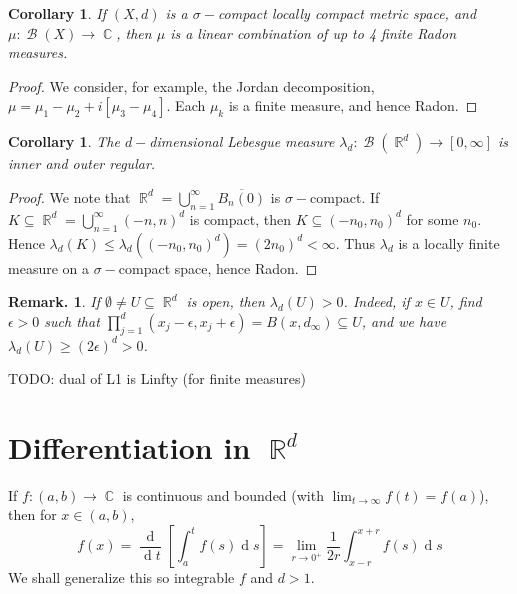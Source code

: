 \documentclass[12pt, a4paper]{memoir}
\DeclareMathOperator{\R}{{\mathbb{R}}}
\DeclareMathOperator{\C}{{\mathbb{C}}}
\newtheorem{corollary}[theorem]{Corollary}
\theoremstyle{nonumberplain}
\newtheorem{remark}{Remark.}
\newtheorem{proof}{Proof}
\DeclareMathOperator{\B}{\mathcal{B}}
\renewcommand{\d}[1]{\ensuremath{\operatorname{d}\!{#1}}} %
\begin{document}
\begin{corollary}
    If $(X,d)$ is a $\sigma-$compact locally compact metric space, and $\mu:\B(X)\to\C$, then $\mu$ is a linear combination of up to 4 finite Radon measures.
\end{corollary}
\begin{proof}
    We consider, for example, the Jordan decomposition, $\mu=\mu_1-\mu_2+i[\mu_3-\mu_4]$.
    Each $\mu_k$ is a finite measure, and hence Radon.
\end{proof}
\begin{corollary}
    The $d-$dimensional Lebesgue measure $\lambda_d:\B(\R^d)\to[0,\infty]$ is inner and outer regular.
\end{corollary}
\begin{proof}
    We note that $\R^d=\bigcup_{n=1}^\infty\overline{B_n(0)}$ is $\sigma-$compact.
    If $K\subseteq\R^d=\bigcup_{n=1}^\infty(-n,n)^d$ is compact, then $K\subseteq(-n_0,n_0)^d$ for some $n_0$.
    Hence $\lambda_d(K)\leq\lambda_d((-n_0,n_0)^d)=(2n_0)^d<\infty$.
    Thus $\lambda_d$ is a locally finite measure on a $\sigma-$compact space, hence Radon.
\end{proof}
\begin{remark}
    If $\emptyset\neq U\subseteq\R^d$ is open, then $\lambda_d(U)>0$.
    Indeed, if $x\in U$, find $\epsilon>0$ such that $\prod_{j=1}^d(x_j-\epsilon,x_j+\epsilon)=B(x,d_\infty)\subseteq U$, and we have $\lambda_d(U)\geq(2\epsilon)^d>0$.
\end{remark}
TODO: dual of L1 is Linfty (for finite measures)
\section{Differentiation in \texorpdfstring{$\R^d$}{Rd}}
If $f:(a,b)\to\C$ is continuous and bounded (with $\lim_{t\to\infty}f(t)=f(a)$), then for $x\in(a,b)$,
\begin{equation*}
    f(x)=\frac{\d{}}{\d{t}}\left[\int_a^t f(s)\d{s}\right]=\lim_{r\to 0^+}\frac{1}{2r}\int_{x-r}^{x+r}f(s)\d{s}
\end{equation*}
We shall generalize this so integrable $f$ and $d>1$.
\end{document}
